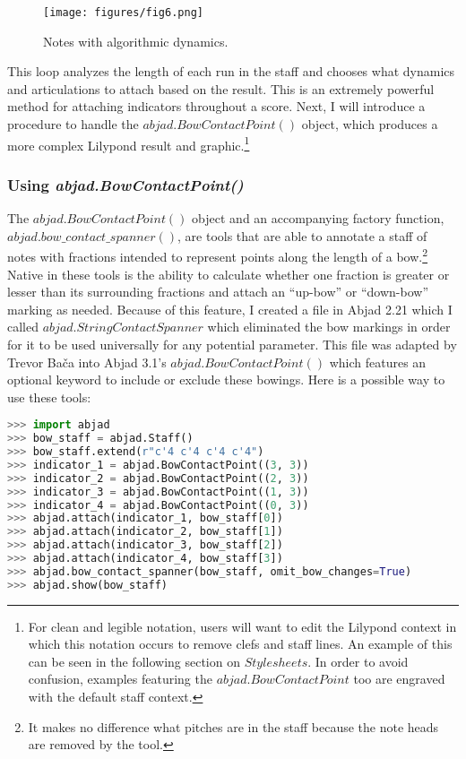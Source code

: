 \singlespace
\begin{figure}[h]
  \texttt{[image: figures/fig6.png]}
  \caption{Notes with algorithmic dynamics.}
  \label{fig:dynamic_attachment_2}
\end{figure}
\doublespace

This loop analyzes the length of each run in the staff and chooses what dynamics and articulations to attach based on the result. This is an extremely powerful method for attaching indicators throughout a score. Next, I will introduce a procedure to handle the $abjad.BowContactPoint()$ object, which produces a more complex Lilypond result and graphic.\footnote{For clean and legible notation, users will want to edit the Lilypond context in which this notation occurs to remove clefs and staff lines. An example of this can be seen in the following section on $Stylesheets$. In order to avoid confusion, examples featuring the $abjad.BowContactPoint$ too are engraved with the default staff context.}

\subsubsection{Using \textit{abjad.BowContactPoint()}}

The $abjad.BowContactPoint()$ object and an accompanying factory function, $abjad.bow\_contact\_spanner()$, are tools that are able to annotate a staff of notes with fractions intended to represent points along the length of a bow.\footnote{It makes no difference what pitches are in the staff because the note heads are removed by the tool.} Native in these tools is the ability to calculate whether one fraction is greater or lesser than its surrounding fractions and attach an ``up-bow'' or ``down-bow'' marking as needed. Because of this feature, I created a file in Abjad 2.21 which I called $abjad.StringContactSpanner$ which eliminated the bow markings in order for it to be used universally for any potential parameter. This file was adapted by Trevor Ba\v{c}a into Abjad 3.1’s $abjad.BowContactPoint()$ which features an optional keyword to include or exclude these bowings. Here is a possible way to use these tools:

\singlespace
\begin{lstlisting}[language=Python, caption=Bow tablature]
>>> import abjad
>>> bow_staff = abjad.Staff()
>>> bow_staff.extend(r"c'4 c'4 c'4 c'4")
>>> indicator_1 = abjad.BowContactPoint((3, 3))
>>> indicator_2 = abjad.BowContactPoint((2, 3))
>>> indicator_3 = abjad.BowContactPoint((1, 3))
>>> indicator_4 = abjad.BowContactPoint((0, 3))
>>> abjad.attach(indicator_1, bow_staff[0])
>>> abjad.attach(indicator_2, bow_staff[1])
>>> abjad.attach(indicator_3, bow_staff[2])
>>> abjad.attach(indicator_4, bow_staff[3])
>>> abjad.bow_contact_spanner(bow_staff, omit_bow_changes=True)
>>> abjad.show(bow_staff)
\end{lstlisting}
\doublespace

